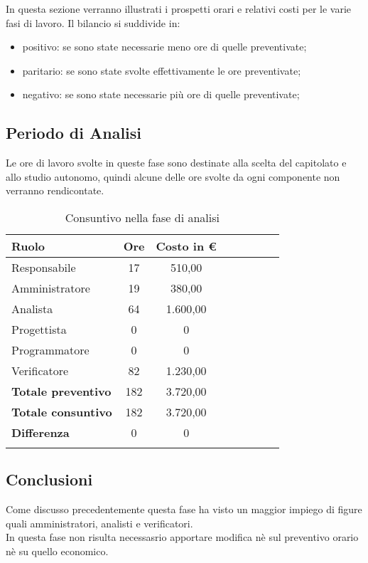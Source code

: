\documentclass[../piano_di_progetto.tex]{subfiles}
\begin{document}
In questa sezione verranno illustrati i prospetti orari e relativi costi per le varie fasi di lavoro. Il bilancio si suddivide in:
\begin{itemize}
\item positivo: se sono state necessarie meno ore di quelle preventivate;
\item paritario: se sono state svolte effettivamente le ore preventivate;
\item negativo: se sono state necessarie più ore di quelle preventivate;
\end{itemize}

\subsection{ Periodo di Analisi}%
\label{sub:cons_analisi}
Le ore di lavoro svolte in queste fase sono destinate alla scelta del capitolato e allo studio autonomo, quindi alcune delle ore svolte da ogni componente non verranno rendicontate.

\begin{center}
	\begin{longtable}{|l|c|c|c|c|c|c|c|}
		\hline
		\rowcolor{lightgray}
		\textbf{Ruolo} & \textbf{Ore} & \textbf{Costo in €}\\
		\hline
		Responsabile & 17 & 510,00 \\
		\hline
		Amministratore & 19 & 380,00 \\
		\hline
		Analista & 64 & 1.600,00 \\
		\hline
		Progettista & 0 & 0 \\
		\hline
		Programmatore & 0 & 0 \\
		\hline
		Verificatore & 82 & 1.230,00 \\
		\hline
		\textbf{Totale preventivo} & 182 & 3.720,00 \\
		\hline
		\textbf{Totale consuntivo} & 182 & 3.720,00 \\
		\hline
		\textbf{Differenza} & 0 & 0\\
		\hline	
		\caption{Consuntivo nella fase di analisi}
	\end{longtable}
\end{center}

\subsection{ Conclusioni}%
\label{sub:cons_fine}
Come discusso precedentemente questa fase ha visto un maggior impiego di figure quali amministratori, analisti e verificatori.\\
In questa fase non risulta necessasrio apportare modifica nè sul preventivo orario nè su quello economico. 
\end{document}
